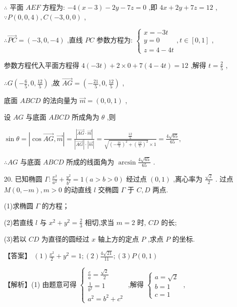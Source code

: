 \documentclass[10pt]{article}
\begin{document}
\(\therefore\) 平面 \({AEF}\) 方程为: \(- 4\left( {x - 3}\right)  - {2y} - {7z} = 0\) ,即 \({4x} + {2y} + {7z} = {12}\) , \(\because P\left( {0,0,4}\right) ,C\left( {-3,0,0}\right)\) ,

\(\therefore \overrightarrow{PC} = \left( {-3,0, - 4}\right)\) ,直线 \({PC}\) 参数方程为: \(\left\{  {\begin{array}{l} x =  - {3t} \\  y = 0 \\  z = 4 - {4t} \end{array},t \in  \left\lbrack  {0,1}\right\rbrack  }\right.\) ,

参数方程代入平面方程得 \(4\left( {-{3t}}\right)  + 2 \times  0 + 7\left( {4 - {4t}}\right)  = {12}\) ,解得 \(t = \frac{2}{5}\) ,

\(\therefore G\left( {-\frac{6}{5},0,\frac{12}{5}}\right)\) ,故 \(\overrightarrow{AG} = \left( {-\frac{21}{5},0,\frac{12}{5}}\right)\) ,

底面 \({ABCD}\) 的法向量为 \(\overrightarrow{m} = \left( {0,0,1}\right)\) ,

设 \({AG}\) 与底面 \({ABCD}\) 所成角为 \(\theta\) ,则

\(\sin \theta  = \left| {\cos \overrightarrow{AG},\overrightarrow{m}}\right|  = \frac{\left| \overrightarrow{AG} \cdot  \overrightarrow{m}\right| }{\left| \overrightarrow{AG}\right|  \cdot  \left| \overrightarrow{m}\right| } = \frac{\frac{12}{5}}{\sqrt{{\left( -\frac{21}{5}\right) }^{2} + {\left( \frac{12}{5}\right) }^{2}} \times  1} = \frac{4\sqrt{65}}{65},\)

\(\therefore {AG}\) 与底面 \({ABCD}\) 所成的线面角为 \(\arcsin \frac{4\sqrt{65}}{65}\) .

20. 已知椭圆 \(\Gamma  : \frac{{x}^{2}}{{a}^{2}} + \frac{{y}^{2}}{{b}^{2}} = 1\left( {a > b > 0}\right)\) 经过点 \(\left( {0,1}\right)\) ,离心率为 \(\frac{\sqrt{2}}{2}\) . 过点 \(M\left( {0, - m}\right) ,m > 0\) 的动直线 \(l\) 交椭圆 \(\Gamma\) 于 \(C,D\) 两点.

(1)求椭圆 \(\Gamma\) 的方程；

(2)若直线 \(l\) 与 \({x}^{2} + {y}^{2} = \frac{2}{3}\) 相切,求当 \(m = 2\) 时, \({CD}\) 的长;

(3)若以 \({CD}\) 为直径的圆经过 \(x\) 轴上方的定点 \(P\) ,求点 \(P\) 的坐标.

【答案】 \(\left( 1\right) \frac{{x}^{2}}{2} + {y}^{2} = 1;\left( 2\right) \frac{4\sqrt{21}}{11};\left( 3\right) P\left( {0,1}\right)\)

【解析】(1) 由题意可得 \(\left\{  \begin{array}{l} \frac{c}{a} = \frac{\sqrt{2}}{2} \\  \frac{1}{{b}^{2}} = 1 \\  {a}^{2} = {b}^{2} + {c}^{2} \end{array}\right.\) ,解得 \(\left\{  \begin{array}{l} a = \sqrt{2} \\  b = 1 \\  c = 1 \end{array}\right.\) ,
\end{document}
